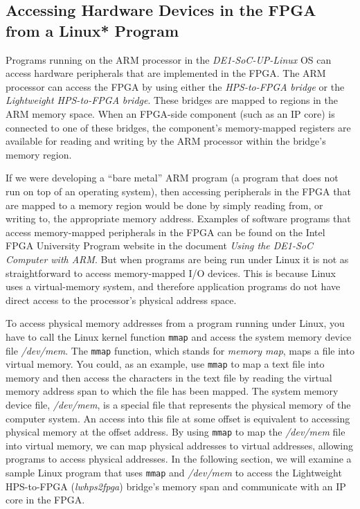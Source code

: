 \documentclass[11pt, twoside, pdftex]{article}
\begin{document}
\subsection{Accessing Hardware Devices in the FPGA from a Linux* Program}

Programs running on the ARM processor in the {\it DE1-SoC-UP-Linux} OS can access hardware 
peripherals that are implemented in the FPGA. The ARM processor can access the FPGA
by using either the {\it HPS-to-FPGA} {\it bridge} or 
the {\it Lightweight HPS-to-FPGA} {\it bridge}. These bridges are mapped to regions 
in the ARM memory space. When an FPGA-side component (such as an IP core) is connected to one 
of these bridges, the component's memory-mapped registers are available for reading and writing 
by the ARM processor within the bridge's memory region. 

If we were developing a ``bare metal'' ARM program (a program that does not run on top of an 
operating system), then accessing peripherals in the FPGA that are mapped to a memory region
would be done by simply reading from, or writing to, the appropriate memory address. Examples 
of software programs that access memory-mapped peripherals in the FPGA can be found on the 
Intel FPGA University Program website in the document {\it Using the DE1-SoC Computer with ARM}. 
But when programs are being run under Linux it is not as straightforward to access 
memory-mapped I/O devices. This is because Linux uses a virtual-memory system, and therefore 
application programs do not have direct access to the processor's physical address space. 

To access physical memory addresses from a program running under Linux, you have to call the
Linux kernel function \texttt{mmap} and access the system memory device file \textit{/dev/mem}. 
The \texttt{mmap} function, which stands for {\it memory map},
maps a file into virtual memory. You could, as an example, use \texttt{mmap} to map a text file 
into memory and then access the characters in the text file by reading the virtual memory address 
span to which the file has been mapped. The system memory device file, \textit{/dev/mem}, is 
a special file that represents the physical memory of the computer system. An access into
this file at some offset is equivalent to accessing physical memory at the offset address. By 
using \texttt{mmap} to map the \textit{/dev/mem} file into virtual memory, we can map 
physical addresses to virtual addresses, allowing programs to access physical addresses. 
In the following section, we will examine a sample Linux program that uses \texttt{mmap} 
and \textit{/dev/mem} to access the Lightweight HPS-to-FPGA ({\it lwhps2fpga}) bridge's
memory span and communicate with an IP core in the FPGA.
\end{document}
